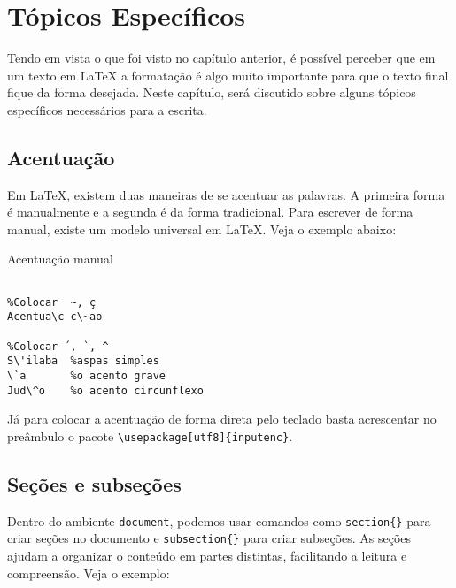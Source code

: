%
%
%
\chapter{T\'opicos Espec\'ificos}
\label{intro} %

Tendo em vista o que foi visto no capítulo anterior, é possível perceber que em um texto em \LaTeX{} a formatação é algo muito importante para que o texto final fique da forma desejada. Neste capítulo, será discutido sobre alguns tópicos específicos necessários para a escrita.

\section{Acentua\c c\~ao}
\label{sec:2}
Em \LaTeX, existem duas maneiras de se acentuar as palavras. A primeira forma é manualmente e a segunda é da forma tradicional. Para escrever de forma manual, existe um modelo universal em \LaTeX. Veja o exemplo abaixo:
\begin{trailer}{Acentuação manual}
\begin{verbatim}

%Colocar  ~, ç
Acentua\c c\~ao  

%Colocar ´, `, ^
S\'ilaba  %aspas simples
\`a       %o acento grave
Jud\^o    %o acento circunflexo

\end{verbatim}
\end{trailer}
 \noindent Já para colocar a acentuação de forma direta pelo teclado basta acrescentar no preâmbulo o pacote \verb|\usepackage[utf8]{inputenc}|. 

\section{Se\c c\~oes e subse\c c\~oes}
Dentro do ambiente \verb|document|, podemos usar comandos como \verb|section{}| para criar se\c c\~oes no documento e \verb|subsection{}| para criar subse\c c\~oes. As se\c c\~oes ajudam a organizar o conte\'udo em partes distintas, facilitando a leitura e compreens\~ao. Veja o exemplo:


